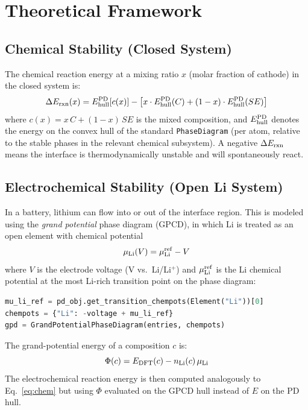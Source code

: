 \documentclass[11pt,letterpaper]{article}
\begin{document}
\section{Theoretical Framework}

\subsection{Chemical Stability (Closed System)}

The chemical reaction energy at a mixing ratio $x$ (molar fraction of cathode)
in the closed system is:
\begin{equation}
  \Delta E_{\rm rxn}(x) = E_{\rm hull}^{\rm PD}\!\left[c(x)\right]
    - \left[ x \cdot E_{\rm hull}^{\rm PD}(C) + (1-x) \cdot E_{\rm hull}^{\rm PD}(SE) \right]
  \label{eq:chem}
\end{equation}
where $c(x) = x\,C + (1-x)\,SE$ is the mixed composition, and
$E_{\rm hull}^{\rm PD}$ denotes the energy on the convex hull of the standard
\texttt{PhaseDiagram} (per atom, relative to the stable phases in the
relevant chemical subsystem). A negative $\Delta E_{\rm rxn}$ means the
interface is thermodynamically unstable and will spontaneously react.

\subsection{Electrochemical Stability (Open Li System)}

In a battery, lithium can flow into or out of the interface region.
This is modeled using the \emph{grand potential} phase diagram (GPCD),
in which Li is treated as an open element with chemical potential
\begin{equation}
  \mu_{\rm Li}(V) = \mu_{\rm Li}^{\rm ref} - V
  \label{eq:muli}
\end{equation}
where $V$ is the electrode voltage (V vs.\ Li/Li$^+$) and
$\mu_{\rm Li}^{\rm ref}$ is the Li chemical potential at the most
Li-rich transition point on the phase diagram:
\begin{lstlisting}[language=Python]
mu_li_ref = pd_obj.get_transition_chempots(Element("Li"))[0]
chempots = {"Li": -voltage + mu_li_ref}
gpd = GrandPotentialPhaseDiagram(entries, chempots)
\end{lstlisting}
The grand-potential energy of a composition $c$ is:
\begin{equation}
  \Phi(c) = E_{\rm DFT}(c) - n_{\rm Li}(c)\,\mu_{\rm Li}
\end{equation}
The electrochemical reaction energy is then computed analogously to
Eq.~\eqref{eq:chem} but using $\Phi$ evaluated on the GPCD hull instead
of $E$ on the PD hull.
\end{document}
